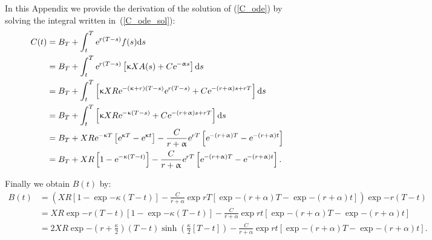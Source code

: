 In this Appendix we provide the derivation of the solution of (\ref{C_ode}) by solving the integral written in~(\ref{C_ode_sol}):
$$
\begin{aligned}
	C(t) 	&= B_T + \int_t^T \text{\sl e}^{r(T-s)}f(s)\text{\rm d} s\\
	&= B_T + \int_t^T \text{\sl e}^{r(T-s)}\left[\upkappa X A(s) + C\text{\sl e}^{-\upalpha s}\right]\text{\rm d} s\\
	&= B_T + \int_t^T \left[\upkappa X R \text{\sl e}^{- (\upkappa + r) (T-s)} \text{\sl e}^{r(T-s)} + C\text{\sl e}^{-(r+\upalpha)s+rT}\right]\text{\rm d} s\\
	&= B_T + \int_t^T \left[\upkappa X R \text{\sl e}^{-\upkappa (T-s)} + C\text{\sl e}^{-(r+\upalpha)s +rT}\right]\text{\rm d} s\\
	&= B_T + {X R \text{\sl e}^{-\upkappa T}}  \left[\text{\sl e}^{\upkappa T} - \text{\sl e}^{\upkappa t}\right] - \frac{C}{r+\upalpha}\text{\sl e}^{rT}\left[\text{\sl e}^{-(r+\upalpha)T}-\text{\sl e}^{-(r+\upalpha)t}\right]\\
	&= B_T + {X R}  \left[1 -  \text{\sl e}^{-\upkappa(T-t)}\right]- \frac{C}{r+\upalpha}\text{\sl e}^{rT}\left[\text{\sl e}^{-(r+\upalpha)T}-\text{\sl e}^{-(r+\upalpha)t}\right] .
\end{aligned}
$$

Finally we obtain $B(t)$ by:
\begin{equation}
	\begin{aligned}
		B(t) 	&= \left({X R}  \left[1 -  \exp{-\kappa(T-t)}\right]- \frac{C}{r+\alpha}\exp{rT}\left[\exp{-(r+\alpha)T}-\exp{-(r+\alpha)t}\right]\right) \exp{-r(T-t)}\\
		&= {X R\exp{-r(T-t)}} \left[1 -  \exp{- \kappa (T-t)}\right]- \frac{C}{r+\alpha}\exp{rt}\left[\exp{-(r+\alpha)T}-\exp{-(r+\alpha)t}\right]\\
		&= {2X R}\exp{-\left(r+\frac{\kappa}{2}\right)(T-t)}\sinh\left(\frac{\kappa}{2}[T-t]\right)- \frac{C}{r+\alpha}\exp{rt}\left[\exp{-(r+\alpha)T}-\exp{-(r+\alpha)t}\right].
	\end{aligned}
\end{equation}